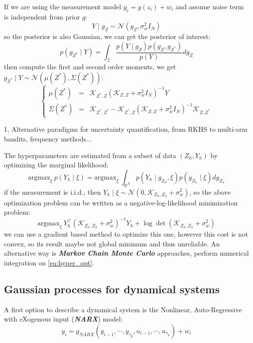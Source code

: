 \documentclass[10pt]{elegantbook}
\newcommand{\mydefination}[1]{\textbf{\textit{\textcolor{structurecolor}{#1}}}}
\begin{document}
If we are using the measurement model $y_i = g(z_i) + w_i$ and assume noise term is independent from prior $g$:
\[
Y \mid g_Z \sim \mathcal N (g_Z, \sigma_w^2 I_N)
\]
so the posterior is also Gaussian, we can get the posterior of interest:
\[
p(g_{Z^*} \mid Y) = \int_{\mathcal Z} \frac{p(Y \mid g_Z)p(g_Z, g_{Z^*})}{p(Y)} dg_Z
\]
then compute the first and second order moments, we get $g_{Z^*} \mid Y \sim \mathcal N (\mu(Z^*), \Sigma(Z^*))$:
\begin{equation} \label{eq:gp_mean_cov}
\left \{
\begin{array}{lll}
    \mu(Z^*) &=& \mathscr{K}_{Z^*, Z} (\mathscr{K}_{Z, Z} + \sigma_w^2 I_N)^{-1} Y \\
    \Sigma(Z^*) &=& \mathscr{K}_{Z^*, Z^*} - \mathscr{K}_{Z^*, Z} (\mathscr{K}_{Z, Z} + \sigma_w^2 I_N)^{-1} \mathscr{K}_{Z, Z^*}
\end{array}    
\right .
\end{equation}

\begin{remark}
    1, Alternative paradigms for uncertainty quantification, from RKHS to multi-arm bandits, frequency methods...
\end{remark}

The hyperparameters are estimated from a subset of data $(Z_h, Y_h)$ by optimizing the marginal likelihood:
\begin{equation} \label{eq:hyper_opt}
\text{argmax}_{\xi} ~ p(Y_h \mid \xi) = \text{argmax}_{\xi} ~ \int_{\mathbb R^N} p(Y_h \mid g_{Z_h}, \xi)p(g_{Z_h} \mid \xi)dg_{Z_h}
\end{equation}
if the measurement is i.i.d., then $Y_h \mid \xi \sim \mathcal N(0, \mathscr{K}_{Z_h, Z_h} + \sigma_w^2)$, so the above optimization
problem can be written as a negative-log-likelihood minimization problem:
\begin{equation} \label{eq:hyper_nll_opt}
\text{argmax}_{\xi} ~ Y_h^{\top}(\mathscr{K}_{Z_h, Z_h} + \sigma_w^2)^{-1}Y_h + \log \det(\mathscr{K}_{Z_h, Z_h} + \sigma_w^2)
\end{equation}
we can use a gradient based method to optimize this one, however this cost is not convex, so its result maybe not global minimum and 
thus unreliable. An alternative way is \mydefination{Markov Chain Monte Carlo} approaches, perform numerical integration on \ref{eq:hyper_opt}.

\subsection{Gaussian processes for dynamical systems}
A first option to describe a dynamical system is the Nonlinear, Auto-Regressive with eXogenous input (\mydefination{NARX}) model:
\[
y_i = g_{NARX}(y_{i-1}, \cdots, y_{\tau_y}, u_{i-1}, \cdots, u_{\tau_u}) + w_i
\]
\end{document}
